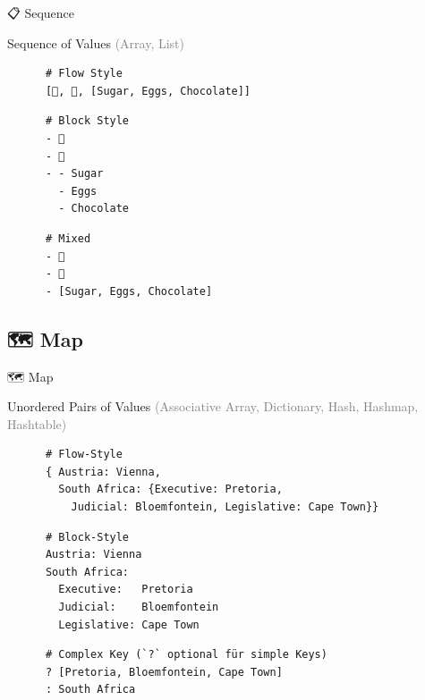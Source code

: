 \documentclass{beamer}
\begin{document}
\begin{frame}[fragile]{📋 Sequence}
  \begin{block}{Sequence of Values \textcolor{gray}{(Array, List)}}
    \vspace{0.3cm}

    \begin{verbatim}
      # Flow Style
      [🍎, 🍊, [Sugar, Eggs, Chocolate]]
    \end{verbatim}

    \vspace{0.1cm}

    \begin{verbatim}
      # Block Style
      - 🍎
      - 🍊
      - - Sugar
        - Eggs
        - Chocolate
    \end{verbatim}

    \vspace{0.1cm}

    \begin{verbatim}
      # Mixed
      - 🍎
      - 🍊
      - [Sugar, Eggs, Chocolate]
    \end{verbatim}
  \end{block}
\end{frame}

\subsection{🗺 Map}

\begin{frame}[fragile]{🗺 Map}
  \begin{block}{Unordered Pairs of Values}
    \textcolor{gray}{(Associative Array, Dictionary, Hash, Hashmap, Hashtable)}
    \vspace{0.2cm}

    \begin{verbatim}
      # Flow-Style
      { Austria: Vienna,
        South Africa: {Executive: Pretoria,
          Judicial: Bloemfontein, Legislative: Cape Town}}
    \end{verbatim}

    \vspace{0.1cm}

    \begin{verbatim}
      # Block-Style
      Austria: Vienna
      South Africa:
        Executive:   Pretoria
        Judicial:    Bloemfontein
        Legislative: Cape Town
    \end{verbatim}

    \vspace{0.1cm}

    \begin{verbatim}
      # Complex Key (`?` optional für simple Keys)
      ? [Pretoria, Bloemfontein, Cape Town]
      : South Africa
    \end{verbatim}
  \end{block}
\end{frame}
\end{document}
